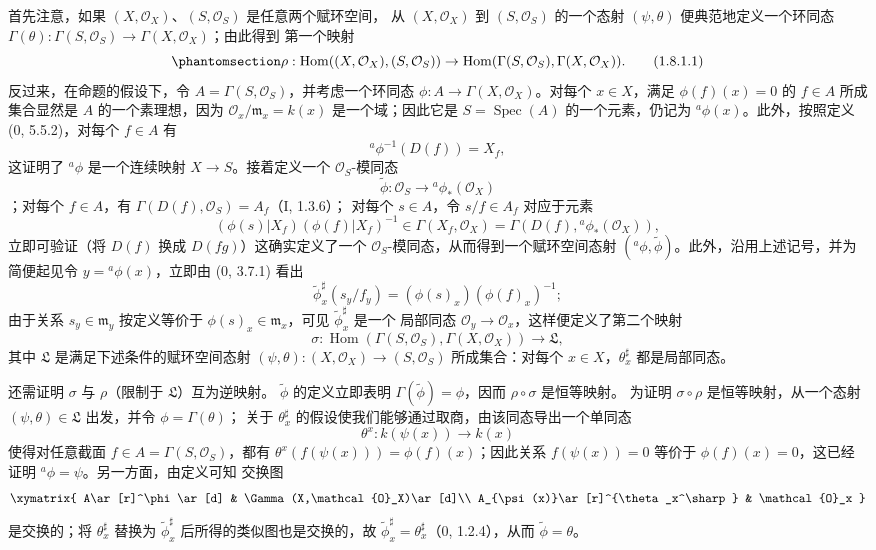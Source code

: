 \documentclass[UTF8,fontset=none,11pt,oneside,openany]{ctexbook}
\providecommand{\sh}{\mathcal}
\providecommand{\vphi}{\phi}
\providecommand{\kres}{k}
\providecommand{\Hom}{\operatorname{Hom}}
\providecommand{\Spec}{\operatorname{Spec}}
\let\EGAOriginalLabel\label
\renewcommand{\label}[1]{\phantomsection\EGAOriginalLabel{#1}}
\begin{document}
首先注意，如果 $(X,\sh{O}_X)$、$(S,\sh{O}_S)$ 是任意两个赋环空间，
从 $(X,\sh{O}_X)$ 到 $(S,\sh{O}_S)$ 的一个态射 $(\psi,\theta)$
便典范地定义一个环同态
$\Gamma(\theta):\Gamma(S,\sh{O}_S)\to\Gamma(X,\sh{O}_X)$；由此得到
第一个映射
\begin{equation}
\label{ega2:addendum:I.1.8.1.1-zh}
  \rho:\Hom((X,\sh{O}_X),(S,\sh{O}_S))
  \to\Hom(\Gamma(S,\sh{O}_S),\Gamma(X,\sh{O}_X)).
\tag{1.8.1.1}
\end{equation}
反过来，在命题的假设下，令 $A=\Gamma(S,\sh{O}_S)$，并考虑一个环同态
$\vphi:A\to\Gamma(X,\sh{O}_X)$。对每个 $x\in X$，满足
$\vphi(f)(x)=0$ 的 $f\in A$ 所成集合显然是 $A$ 的一个素理想，因为
$\sh{O}_x/\mathfrak m_x=\kres(x)$ 是一个域；因此它是
$S=\Spec(A)$ 的一个元素，仍记为 ${}^a\vphi(x)$。此外，按照定义
(0, 5.5.2)，对每个 $f\in A$ 有
\[
  {}^a\vphi^{-1}(D(f))=X_f,
\]
这证明了 ${}^a\vphi$ 是一个连续映射 $X\to S$。接着定义一个
$\sh{O}_S$-模同态
\[
  \widetilde{\vphi}:\sh{O}_S\to{}^a\vphi_*(\sh{O}_X)
\]
；对每个 $f\in A$，有 $\Gamma(D(f),\sh{O}_S)=A_f$（I, 1.3.6）；
对每个 $s\in A$，令 $s/f\in A_f$ 对应于元素
\[
  (\vphi(s)|X_f)(\vphi(f)|X_f)^{-1}
  \in\Gamma(X_f,\sh{O}_X)
  =\Gamma(D(f),{}^a\vphi_*(\sh{O}_X)),
\]
立即可验证（将 $D(f)$ 换成 $D(fg)$）这确实定义了一个
$\sh{O}_S$-模同态，从而得到一个赋环空间态射
$({}^a\vphi,\widetilde{\vphi})$。此外，沿用上述记号，并为简便起见令
$y={}^a\vphi(x)$，立即由 (0, 3.7.1) 看出
\[
  \widetilde{\vphi}_x^\sharp(s_y/f_y)
  =(\vphi(s)_x)(\vphi(f)_x)^{-1};
\]
由于关系 $s_y\in\mathfrak m_y$ 按定义等价于
$\vphi(s)_x\in\mathfrak m_x$，可见 $\widetilde{\vphi}_x^\sharp$ 是一个
局部同态 $\sh{O}_y\to\sh{O}_x$，这样便定义了第二个映射
\[
  \sigma:\Hom(\Gamma(S,\sh{O}_S),\Gamma(X,\sh{O}_X))\to\mathfrak L,
\]
其中 $\mathfrak L$ 是满足下述条件的赋环空间态射
$(\psi,\theta):(X,\sh{O}_X)\to(S,\sh{O}_S)$ 所成集合：对每个
$x\in X$，$\theta_x^\sharp$ 都是局部同态。

还需证明 $\sigma$ 与 $\rho$（限制于 $\mathfrak L$）互为逆映射。
$\widetilde{\vphi}$ 的定义立即表明
$\Gamma(\widetilde{\vphi})=\vphi$，因而 $\rho\circ\sigma$ 是恒等映射。
为证明 $\sigma\circ\rho$ 是恒等映射，从一个态射
$(\psi,\theta)\in\mathfrak L$ 出发，并令 $\vphi=\Gamma(\theta)$；
关于 $\theta_x^\sharp$ 的假设使我们能够通过取商，由该同态导出一个单同态
\[
  \theta^x:\kres(\psi(x))\to\kres(x)
\]
使得对任意截面 $f\in A=\Gamma(S,\sh{O}_S)$，都有
$\theta^x(f(\psi(x)))=\vphi(f)(x)$；因此关系 $f(\psi(x))=0$ 等价于
$\vphi(f)(x)=0$，这已经证明 ${}^a\vphi=\psi$。另一方面，由定义可知
交换图
\[
  \xymatrix{
    A\ar[r]^\vphi\ar[d] &
    \Gamma(X,\sh{O}_X)\ar[d]\\
    A_{\psi(x)}\ar[r]^{\theta_x^\sharp} &
    \sh{O}_x
  }
\]
是交换的；将 $\theta_x^\sharp$ 替换为
$\widetilde{\vphi}_x^\sharp$ 后所得的类似图也是交换的，故
$\widetilde{\vphi}_x^\sharp=\theta_x^\sharp$（0, 1.2.4），从而
$\widetilde{\vphi}=\theta$。
\end{document}
